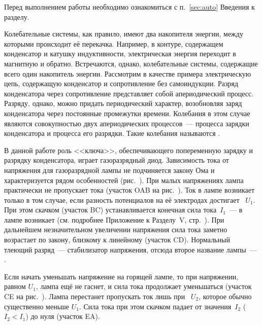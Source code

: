 


Перед выполнением работы необходимо ознакомиться с п.~\ref{sec:auto} Введения
к разделу.

Колебательные системы, как правило, имеют два накопителя энергии, между
которыми происходит её перекачка. Например, в контуре,
содержащем конденсатор и катушку индуктивности, электрическая энергия переходит
в магнитную и обратно. Встречаются, однако, колебательные системы, 
содержащие всего один накопитель энергии. Рассмотрим в качестве примера
электрическую цепь, содержащую конденсатор и сопротивление без самоиндукции.
Разряд конденсатора через сопротивление представляет собой апериодический процесс. 
Разряду, однако, можно придать периодический характер, возобновляя заряд
конденсатора через постоянные промежутки времени. Колебания в этом случае
являются совокупностью двух апериодических процессов~--- процесса зарядки 
конденсатора и процесса его разрядки. Такие колебания называются 
.


В данной работе роль <<ключа>>, обеспечивающего попеременную зарядку и
разрядку конденсатора, играет газоразрядный диод. 
Зависимость тока от напряжения для газоразрядной лампы не подчиняется
закону Ома и характеризуется рядом
особенностей (рис.~). При малых напряжениях лампа
практически не пропускает тока (участок OAB на рис.~).
Ток в лампе возникает только в том случае, если разность потенциалов на её
электродах достигает ~$U_1$. 
При этом скачком (участок BC) устанавливается конечная сила тока~$I_1$~--- в лампе возникает
 (см. подробнее Приложение к Разделу~V,
стр.~\pageref{sec:discharge}). 
При дальнейшем незначительном увеличении напряжения сила тока заметно возрастает 
по закону, близкому к линейному (участок CD). Нормальный тлеющий разряд~---
стабилизатор напряжения, отсюда второе название лампы~--- .


Если начать уменьшать напряжение на горящей лампе, то при напряжении, равном
$U_1$, лампа ещё не гаснет, и сила тока
продолжает уменьшаться (участок CE на рис.~). 
Лампа перестанет пропускать ток лишь при ~$U_2$, 
которое обычно
существенно меньше $U_1$. Сила тока при этом скачком падает от значения~$I_2$
($I_2<I_1$) до нуля (участок EA).

